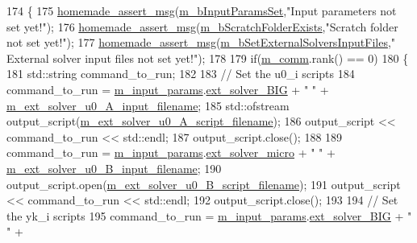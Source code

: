 \begin{DoxyCode}
174 \{
175     \hyperlink{common__header_8h_a593ccc80b790b2268653fcf6597bf451}{homemade\_assert\_msg}(\hyperlink{classcarl_1_1_solver___files___setup_a7187af3c4a90be2d8ad2a25c11c0e910}{m\_bInputParamsSet},\textcolor{stringliteral}{"Input parameters not set
       yet!"});
176     \hyperlink{common__header_8h_a593ccc80b790b2268653fcf6597bf451}{homemade\_assert\_msg}(\hyperlink{classcarl_1_1_solver___files___setup_ac59627eab870e65887560595d0fbc025}{m\_bScratchFolderExists},\textcolor{stringliteral}{"Scratch folder not
       set yet!"});
177     \hyperlink{common__header_8h_a593ccc80b790b2268653fcf6597bf451}{homemade\_assert\_msg}(\hyperlink{classcarl_1_1_solver___files___setup_ae9334ddcfaace89ab70ea918190cfd08}{m\_bSetExternalSolversInputFiles},\textcolor{stringliteral}{"
      External solver input files not set yet!"});
178 
179     \textcolor{keywordflow}{if}(\hyperlink{classcarl_1_1_solver___files___setup_aa8049195d5e383a0ca4295795e3f5751}{m\_comm}.rank() == 0)
180     \{
181         std::string command\_to\_run;
182 
183         \textcolor{comment}{// Set the u0\_i scripts}
184         command\_to\_run = \hyperlink{classcarl_1_1_solver___files___setup_aa5804bf6c6e506b382766333f232d3d5}{m\_input\_params}.\hyperlink{structcarl_1_1feti__setup__init__params_a90db585fd2b345de1b58f60986785195}{ext\_solver\_BIG} + \textcolor{stringliteral}{" "} + 
      \hyperlink{classcarl_1_1_solver___files___setup_a32c0d90d116aab36f712795956403913}{m\_ext\_solver\_u0\_A\_input\_filename};
185         std::ofstream output\_script(\hyperlink{classcarl_1_1_solver___files___setup_ac870acbdb942520edc49f0935605dd0b}{m\_ext\_solver\_u0\_A\_script\_filename});
186         output\_script << command\_to\_run << std::endl;
187         output\_script.close();
188 
189         command\_to\_run = \hyperlink{classcarl_1_1_solver___files___setup_aa5804bf6c6e506b382766333f232d3d5}{m\_input\_params}.\hyperlink{structcarl_1_1feti__setup__init__params_aaa4b53d66e1dde62585701fab931a50c}{ext\_solver\_micro} + \textcolor{stringliteral}{" "} + 
      \hyperlink{classcarl_1_1_solver___files___setup_a682f749b73abaaffa3fdcd8b272eda2e}{m\_ext\_solver\_u0\_B\_input\_filename};
190         output\_script.open(\hyperlink{classcarl_1_1_solver___files___setup_a890a41a7fb4b1130eb9fe558a9509af2}{m\_ext\_solver\_u0\_B\_script\_filename});
191         output\_script << command\_to\_run << std::endl;
192         output\_script.close();
193 
194         \textcolor{comment}{// Set the yk\_i scripts}
195         command\_to\_run = \hyperlink{classcarl_1_1_solver___files___setup_aa5804bf6c6e506b382766333f232d3d5}{m\_input\_params}.\hyperlink{structcarl_1_1feti__setup__init__params_a90db585fd2b345de1b58f60986785195}{ext\_solver\_BIG} + \textcolor{stringliteral}{" "} + 

\end{DoxyCode}
